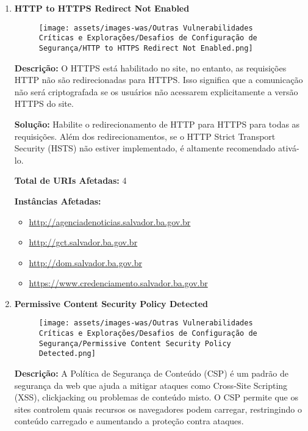 \documentclass[a4paper,12pt]{article}
\begin{document}
\begin{enumerate}
\item \textbf{HTTP to HTTPS Redirect Not Enabled}

                        \begin{figure}[h!]
                        \centering
                        \texttt{[image: assets/images-was/Outras Vulnerabilidades Críticas e Explorações/Desafios de Configuração de Segurança/HTTP to HTTPS Redirect Not Enabled.png]}
                        \end{figure}
                        \FloatBarrier
                        \textbf{Descrição:} O HTTPS está habilitado no site, no entanto, as requisições HTTP não são redirecionadas para HTTPS. Isso significa que a comunicação não será criptografada se os usuários não acessarem explicitamente a versão HTTPS do site.

\textbf{Solução:} Habilite o redirecionamento de HTTP para HTTPS para todas as requisições. Além dos redirecionamentos, se o HTTP Strict Transport Security (HSTS) não estiver implementado, é altamente recomendado ativá-lo.

\textbf{Total de URIs Afetadas:} 4

\textbf{Instâncias Afetadas:}
\begin{itemize}
    \item \url{http://agenciadenoticias.salvador.ba.gov.br}
    \item \url{http://gct.salvador.ba.gov.br}
    \item \url{http://dom.salvador.ba.gov.br}
    \item \url{https://www.credenciamento.salvador.ba.gov.br}
\end{itemize}

\item \textbf{Permissive Content Security Policy Detected}

                        \begin{figure}[h!]
                        \centering
                        \texttt{[image: assets/images-was/Outras Vulnerabilidades Críticas e Explorações/Desafios de Configuração de Segurança/Permissive Content Security Policy Detected.png]}
                        \end{figure}
                        \FloatBarrier
                        \textbf{Descrição:} A Política de Segurança de Conteúdo (CSP) é um padrão de segurança da web que ajuda a mitigar ataques como Cross-Site Scripting (XSS), clickjacking ou problemas de conteúdo misto. O CSP permite que os sites controlem quais recursos os navegadores podem carregar, restringindo o conteúdo carregado e aumentando a proteção contra ataques.


\end{enumerate}
\end{document}
